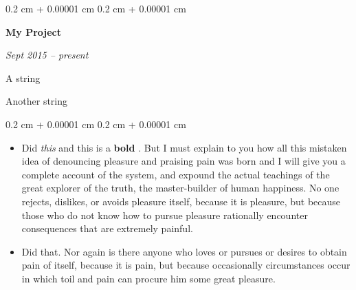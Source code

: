 \documentclass[10pt, letterpaper]{article}
\newenvironment{summary}{
    \begin{description}[
        topsep=0.10 cm,
        parsep=0.10 cm,
        partopsep=0pt,
        itemsep=0pt,
        leftmargin=0.4 cm + 10pt
    ]
}{
    \end{description}
} %
\newenvironment{highlights}{
    \begin{itemize}[
        topsep=0.10 cm,
        parsep=0.10 cm,
        partopsep=0pt,
        itemsep=0pt,
        leftmargin=0.4 cm + 10pt
    ]
}{
    \end{itemize}
} %
\newenvironment{onecolentry}{
    \begin{adjustwidth}{
        0.2 cm + 0.00001 cm
    }{
        0.2 cm + 0.00001 cm
    }
}{
    \end{adjustwidth}
} %
\newenvironment{twocolentry}[2][]{
    \onecolentry
    \def\secondColumn{#2}
    \setcolumnwidth{\fill, 4.5 cm}
    \begin{paracol}{2}
}{
    \switchcolumn \raggedleft \secondColumn
    \end{paracol}
    \endonecolentry
} %
\let\hrefWithoutArrow\href
\renewcommand{\href}[2]{\hrefWithoutArrow{#1}{\ifthenelse{\equal{#2}{}}{ }{#2 }\raisebox{.15ex}{\footnotesize \faExternalLink*}}}
\begin{document}
        \begin{twocolentry}{
            
            
        \textit{Sept 2015 – present}}
            \textbf{My Project}
        \end{twocolentry}
            \begin{summary}
                \item A string
                \item Another string
            \end{summary}
        \vspace{0.10 cm}
        \begin{onecolentry}
            \begin{highlights}
                \item Did \textit{this} and this is a \textbf{bold} \href{https://example.com}{link}. But I must explain to you how all this mistaken idea of denouncing pleasure and praising pain was born and I will give you a complete account of the system, and expound the actual teachings of the great explorer of the truth, the master-builder of human happiness. No one rejects, dislikes, or avoids pleasure itself, because it is pleasure, but because those who do not know how to pursue pleasure rationally encounter consequences that are extremely painful.
                \item Did that. Nor again is there anyone who loves or pursues or desires to obtain pain of itself, because it is pain, but because occasionally circumstances occur in which toil and pain can procure him some great pleasure.
            \end{highlights}
        \end{onecolentry}


        \vspace{0.2 cm}
\end{document}
